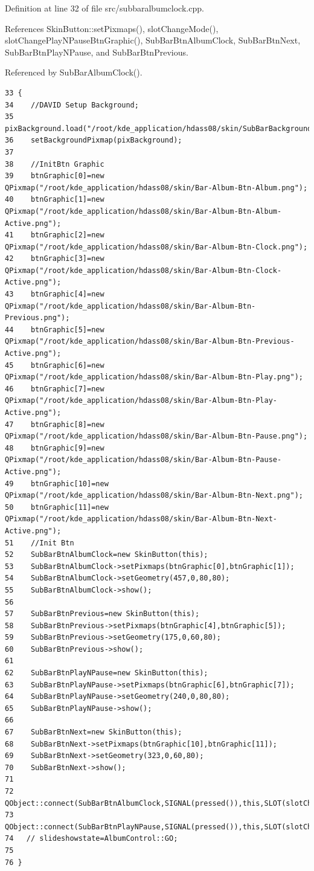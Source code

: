 Definition at line 32 of file src/subbaralbumclock.cpp.

References Skin\-Button::set\-Pixmaps(), slot\-Change\-Mode(), slot\-Change\-Play\-NPause\-Btn\-Graphic(), Sub\-Bar\-Btn\-Album\-Clock, Sub\-Bar\-Btn\-Next, Sub\-Bar\-Btn\-Play\-NPause, and Sub\-Bar\-Btn\-Previous.

Referenced by Sub\-Bar\-Album\-Clock().



\footnotesize\begin{verbatim}33 {
34    //DAVID Setup Background;
35    pixBackground.load("/root/kde_application/hdass08/skin/SubBarBackground.png");
36    setBackgroundPixmap(pixBackground);
37    
38    //InitBtn Graphic
39    btnGraphic[0]=new QPixmap("/root/kde_application/hdass08/skin/Bar-Album-Btn-Album.png");
40    btnGraphic[1]=new QPixmap("/root/kde_application/hdass08/skin/Bar-Album-Btn-Album-Active.png");
41    btnGraphic[2]=new QPixmap("/root/kde_application/hdass08/skin/Bar-Album-Btn-Clock.png");
42    btnGraphic[3]=new QPixmap("/root/kde_application/hdass08/skin/Bar-Album-Btn-Clock-Active.png");
43    btnGraphic[4]=new QPixmap("/root/kde_application/hdass08/skin/Bar-Album-Btn-Previous.png");
44    btnGraphic[5]=new QPixmap("/root/kde_application/hdass08/skin/Bar-Album-Btn-Previous-Active.png");
45    btnGraphic[6]=new QPixmap("/root/kde_application/hdass08/skin/Bar-Album-Btn-Play.png");
46    btnGraphic[7]=new QPixmap("/root/kde_application/hdass08/skin/Bar-Album-Btn-Play-Active.png");
47    btnGraphic[8]=new QPixmap("/root/kde_application/hdass08/skin/Bar-Album-Btn-Pause.png");
48    btnGraphic[9]=new QPixmap("/root/kde_application/hdass08/skin/Bar-Album-Btn-Pause-Active.png");
49    btnGraphic[10]=new QPixmap("/root/kde_application/hdass08/skin/Bar-Album-Btn-Next.png");
50    btnGraphic[11]=new QPixmap("/root/kde_application/hdass08/skin/Bar-Album-Btn-Next-Active.png");
51    //Init Btn
52    SubBarBtnAlbumClock=new SkinButton(this);
53    SubBarBtnAlbumClock->setPixmaps(btnGraphic[0],btnGraphic[1]);
54    SubBarBtnAlbumClock->setGeometry(457,0,80,80);
55    SubBarBtnAlbumClock->show();
56    
57    SubBarBtnPrevious=new SkinButton(this);
58    SubBarBtnPrevious->setPixmaps(btnGraphic[4],btnGraphic[5]);
59    SubBarBtnPrevious->setGeometry(175,0,60,80);
60    SubBarBtnPrevious->show();
61    
62    SubBarBtnPlayNPause=new SkinButton(this);
63    SubBarBtnPlayNPause->setPixmaps(btnGraphic[6],btnGraphic[7]);
64    SubBarBtnPlayNPause->setGeometry(240,0,80,80);
65    SubBarBtnPlayNPause->show();
66    
67    SubBarBtnNext=new SkinButton(this);
68    SubBarBtnNext->setPixmaps(btnGraphic[10],btnGraphic[11]);
69    SubBarBtnNext->setGeometry(323,0,60,80);
70    SubBarBtnNext->show();
71    
72    QObject::connect(SubBarBtnAlbumClock,SIGNAL(pressed()),this,SLOT(slotChangeMode()));
73    QObject::connect(SubBarBtnPlayNPause,SIGNAL(pressed()),this,SLOT(slotChangePlayNPauseBtnGraphic()));
74   // slideshowstate=AlbumControl::GO;
75 
76 }
\end{verbatim}\normalsize 


